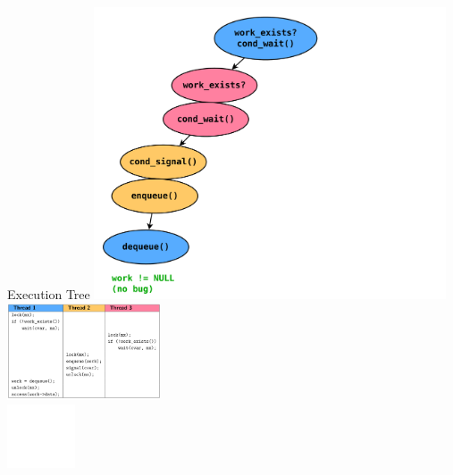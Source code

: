 \documentclass[xcolor=dvipsnames]{beamer}
\begin{document}
\begin{frame}{Execution Tree}
		\includegraphics[width=0.78\textwidth]{execution-tree-0.pdf} \\
		\vspace{-3in}
		\hspace{3in}
		\includegraphics[width=0.34\textwidth]{table-0.png}
		\\
		\vspace{1.2in}
		\hspace{3.7in}
		\includegraphics[width=0.15\textwidth]{frownie-blank.png}
\end{frame}
\end{document}

